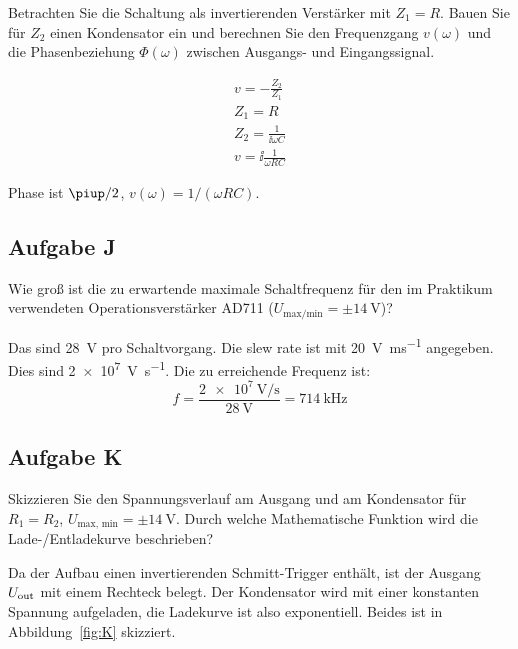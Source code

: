 \begin{problem}
	Betrachten Sie die Schaltung als invertierenden Verstärker mit $Z_1 = R$.
	Bauen Sie für $Z_2$ einen Kondensator ein und berechnen Sie den
	Frequenzgang $v(\omega)$ und die Phasenbeziehung $\Phi(\omega)$ zwischen
	Ausgangs- und Eingangssignal.
\end{problem}

\begin{gather*}
	v = - \frac{Z_2}{Z_1} \\
	Z_1 = R \\
	Z_2 = \frac{1}{\ii \omega C} \\
	v = \ii \frac{1}{\omega RC}
\end{gather*}

Phase ist $\piup/2$, $v(\omega) = 1 / (\omega RC)$.

\subsection{Aufgabe J}

\begin{problem}
	Wie groß ist die zu erwartende maximale Schaltfrequenz für den im Praktikum
	verwendeten Operationsverstärker AD711 ($U_\text{max/min} = \pm
	\SI{14}\volt$)?
\end{problem}

Das sind \SI{28}{\volt} pro Schaltvorgang. Die slew rate ist mit
\SI{20}{\volt\per\milli\second} angegeben. Dies sind
\SI{2e7}{\volt\per\second}. Die zu erreichende Frequenz ist:
\[
	f = \frac{\SI{2e7}{\volt\per\second}}{\SI{28}\volt} = \SI{714}{\kilo\hertz}
\]

\FloatBarrier
\subsection{Aufgabe K}

\begin{problem}
	Skizzieren Sie den Spannungsverlauf am Ausgang und am Kondensator für $R_1
	= R_2$, $U_\text{max, min} = \pm \SI{14}\volt$. Durch welche Mathematische
	Funktion wird die Lade-/Entladekurve beschrieben?
\end{problem}

Da der Aufbau einen invertierenden Schmitt-Trigger enthält, ist der Ausgang
$U_\text{out}$ mit einem Rechteck belegt. Der Kondensator wird mit einer konstanten
Spannung aufgeladen, die Ladekurve ist also exponentiell. Beides ist in
Abbildung~\ref{fig:K} skizziert.


